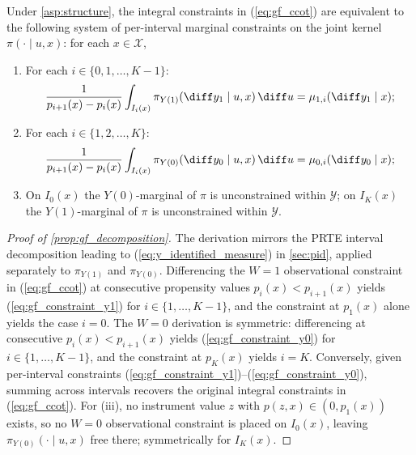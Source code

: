 \begin{proposition}\label{prop:gf_decomposition}
    Under \cref{asp:structure}, the integral constraints in (\ref{eq:gf_ccot}) are equivalent to the following system of per-interval marginal constraints on the joint kernel $\pi(\cdot \mid u, x)$: for each $x \in \mathcal{X}$,
    \begin{enumerate}
        \item[\textup{(i)}] For each $i \in \{0, 1, \dots, K-1\}$:
        \begin{equation}\label{eq:gf_constraint_y1}
            \frac{1}{p_{i+1}(x) - p_i(x)} \int_{I_i(x)} \pi_{Y(1)}(\diff y_1 \mid u, x)\, \diff u = \mu_{1, i}(\diff y_1 \mid x);
        \end{equation}
        \item[\textup{(ii)}] For each $i \in \{1, 2, \dots, K\}$:
        \begin{equation}\label{eq:gf_constraint_y0}
            \frac{1}{p_{i+1}(x) - p_i(x)} \int_{I_i(x)} \pi_{Y(0)}(\diff y_0 \mid u, x)\, \diff u = \mu_{0, i}(\diff y_0 \mid x);
        \end{equation}
        \item[\textup{(iii)}] On $I_0(x)$ the $Y(0)$-marginal of $\pi$ is unconstrained within $\mathcal{Y}$; on $I_K(x)$ the $Y(1)$-marginal of $\pi$ is unconstrained within $\mathcal{Y}$.
    \end{enumerate}
\end{proposition}

\begin{proof}[Proof of \cref{prop:gf_decomposition}]
    The derivation mirrors the PRTE interval decomposition leading to (\ref{eq:y_identified_measure}) in \cref{sec:pid}, applied separately to $\pi_{Y(1)}$ and $\pi_{Y(0)}$. Differencing the $W = 1$ observational constraint in (\ref{eq:gf_ccot}) at consecutive propensity values $p_i(x) < p_{i+1}(x)$ yields (\ref{eq:gf_constraint_y1}) for $i \in \{1, \dots, K-1\}$, and the constraint at $p_1(x)$ alone yields the case $i = 0$. The $W = 0$ derivation is symmetric: differencing at consecutive $p_i(x) < p_{i+1}(x)$ yields (\ref{eq:gf_constraint_y0}) for $i \in \{1, \dots, K-1\}$, and the constraint at $p_K(x)$ yields $i = K$. Conversely, given per-interval constraints (\ref{eq:gf_constraint_y1})--(\ref{eq:gf_constraint_y0}), summing across intervals recovers the original integral constraints in (\ref{eq:gf_ccot}). For (iii), no instrument value $z$ with $p(z, x) \in (0, p_1(x))$ exists, so no $W = 0$ observational constraint is placed on $I_0(x)$, leaving $\pi_{Y(0)}(\cdot \mid u, x)$ free there; symmetrically for $I_K(x)$.
\end{proof}

